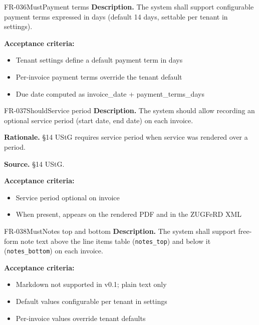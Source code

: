 \documentclass[11pt,a4paper]{article}
\begin{document}
\begin{requirement}{FR-036}{Must}{Payment terms}
\textbf{Description.} The system shall support configurable payment terms expressed in days (default 14 days, settable per tenant in settings).

\textbf{Acceptance criteria:}
\begin{itemize}
    \item Tenant settings define a default payment term in days
    \item Per-invoice payment terms override the tenant default
    \item Due date computed as invoice\_date + payment\_terms\_days
\end{itemize}
\end{requirement}

\begin{requirement}{FR-037}{Should}{Service period}
\textbf{Description.} The system should allow recording an optional service period (start date, end date) on each invoice.

\textbf{Rationale.} \S14 UStG requires service period when service was rendered over a period.

\textbf{Source.} \S14 UStG.

\textbf{Acceptance criteria:}
\begin{itemize}
    \item Service period optional on invoice
    \item When present, appears on the rendered PDF and in the ZUGFeRD XML
\end{itemize}
\end{requirement}

\begin{requirement}{FR-038}{Must}{Notes top and bottom}
\textbf{Description.} The system shall support free-form note text above the line items table (\texttt{notes\_top}) and below it (\texttt{notes\_bottom}) on each invoice.

\textbf{Acceptance criteria:}
\begin{itemize}
    \item Markdown not supported in v0.1; plain text only
    \item Default values configurable per tenant in settings
    \item Per-invoice values override tenant defaults
\end{itemize}
\end{requirement}
\end{document}
